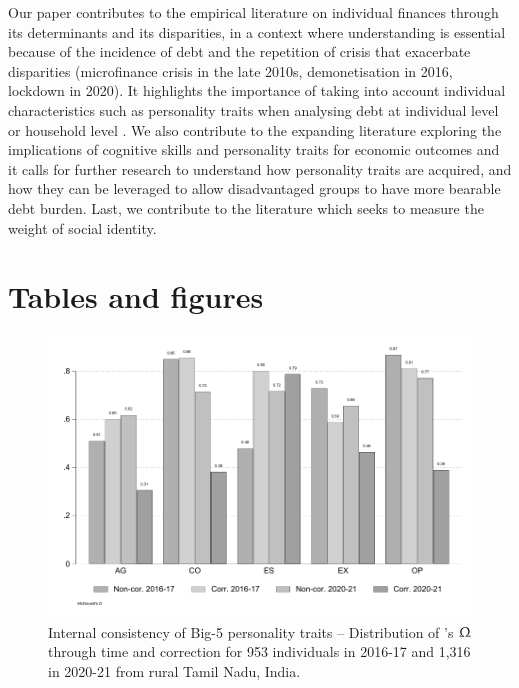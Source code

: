 \documentclass[a4paper, 11pt, onecolumn]{article}
\begin{document}
Our paper contributes to the empirical literature on individual finances through its determinants and its disparities, in a context where understanding is essential because of the incidence of debt and the repetition of crisis that exacerbate disparities (microfinance crisis in the late 2010s, demonetisation in 2016, lockdown in 2020).
It highlights the importance of taking into account individual characteristics such as personality traits when analysing debt at individual level or household level \citep{Brown2014}.
We also contribute to the expanding literature exploring the implications of cognitive skills and personality traits for economic outcomes and it calls for further research to understand how personality traits are acquired, and how they can be leveraged to allow disadvantaged groups to have more bearable debt burden.
Last, we contribute to the literature which seeks to measure the weight of social identity.




\clearpage
\newpage
%








\clearpage
\newpage
\section*{Tables and figures}

\begin{figure}[!h]
\raggedright
\includegraphics[scale=0.8]{INPUT/omega}
\caption{Internal consistency of Big-5 personality traits -- Distribution of \citeauthor{McDonald1999}'s $\Upomega$ through time and correction for 953 individuals in 2016-17 and 1,316 in 2020-21 from rural Tamil Nadu, India.}
\label{fig:omega}
\end{figure}
\end{document}
